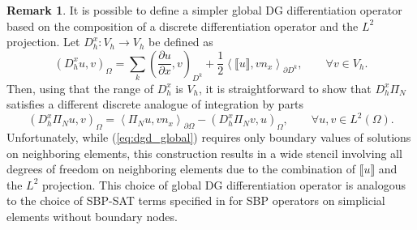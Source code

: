 \documentclass[preprint,10pt]{elsarticle}
\theoremstyle{definition}
\theoremstyle{lemma}
\newtheorem*{remark}{Remark}
\theoremstyle{theorem}
\theoremstyle{assumption}
\newcommand{\pd}[2]{\frac{\partial#1}{\partial#2}}
\newcommand{\LRp}[1]{\left( #1 \right)}
\newcommand{\LRa}[1]{\left\langle #1 \right\rangle}
\newcommand{\jump}[1] {\ensuremath{\llbracket#1\rrbracket}}
\renewcommand{\L}{L^2\LRp{\Omega}}
\newcommand{\note}[1]{{\color{blue}{#1}}}
\begin{document}
\begin{remark}
It is possible to define a simpler global DG differentiation operator based on the composition of a discrete differentiation operator and the $L^2$ projection.  Let ${D}^x_h: V_h\rightarrow V_h$ be defined as
\[
\LRp{D^x_h u,v}_{\Omega} = \sum_k \LRp{\pd{u}{x},v}_{D^k} + \frac{1}{2}\LRa{\jump{u},v{n}_x}_{\partial D^k}, \qquad \forall v \in V_h.
\]
Then, using that the range of $D^x_h$ is $V_h$, it is straightforward to show that $D^x_h \Pi_N$ satisfies a different discrete analogue of integration by parts
\[
\LRp{D^x_h\Pi_N u, v}_{\Omega} = \LRa{\Pi_N u,v{n}_x}_{\partial \Omega} - \LRp{D^x_h\Pi_N v, u}_{\Omega}, \qquad \forall u,v\in \L.
\]
Unfortunately, while (\ref{eq:dgd_global}) requires only boundary values of solutions on neighboring elements, this construction results in a wide stencil involving all degrees of freedom on neighboring elements due to the combination of $\jump{u}$ and the $L^2$ projection.  This choice of global DG differentiation operator is analogous to the choice of SBP-SAT terms specified in \cite{fernandez2016simultaneous} for SBP operators on simplicial elements without boundary nodes.  
\end{remark}

\end{document}
